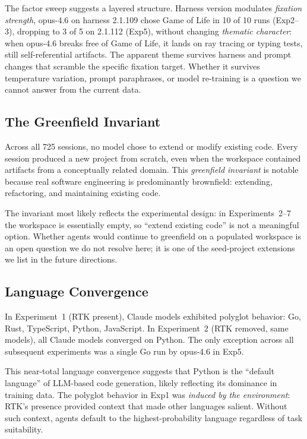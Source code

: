 \documentclass{article}
\begin{document}
The factor sweep suggests a layered structure. Harness
version modulates \emph{fixation strength}, opus-4.6 on
harness 2.1.109 chose Game of Life in 10 of 10 runs
(Exp2--3), dropping to 3 of 5 on 2.1.112 (Exp5), without
changing \emph{thematic character}: when opus-4.6 breaks
free of Game of Life, it lands on ray tracing or typing
tests, still self-referential artifacts. The apparent
theme survives harness and prompt changes that scramble the
specific fixation target. Whether it survives temperature
variation, prompt paraphrases, or model re-training is a
question we cannot answer from the current data.

\subsection{The Greenfield Invariant}

Across all 725 sessions, no model chose to extend or modify
existing code. Every session produced a new project from
scratch, even when the workspace contained artifacts from a
conceptually related domain. This \emph{greenfield invariant}
is notable because real software engineering is predominantly
brownfield: extending, refactoring, and maintaining existing
code.

The invariant most likely reflects the experimental design: in
Experiments~2--7 the workspace is essentially empty, so
``extend existing code'' is not a meaningful option. Whether
agents would continue to greenfield on a populated workspace
is an open question we do not resolve here; it is one of the
seed-project extensions we list in the future directions.

\subsection{Language Convergence}

In Experiment~1 (RTK present), Claude models exhibited polyglot
behavior: Go, Rust, TypeScript, Python, JavaScript. In
Experiment~2 (RTK removed, same models), all Claude models
converged on Python. The only exception across all subsequent
experiments was a single Go run by opus-4.6 in Exp5.

This near-total language convergence suggests that Python is the
``default language'' of LLM-based code generation, likely
reflecting its dominance in training data. The polyglot behavior
in Exp1 was \emph{induced by the environment}: RTK's presence
provided context that made other languages salient. Without such
context, agents default to the highest-probability language
regardless of task suitability.
\end{document}
